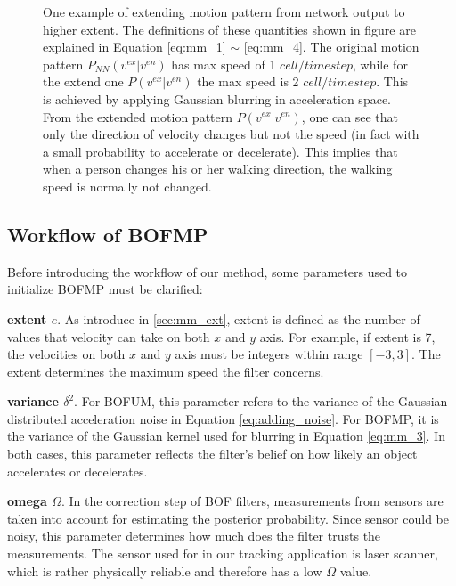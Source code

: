\begin{figure}[hp]
\begin{tabular}{cc}
\end{tabular} 
\caption[One example of extending motion pattern probabilities from network output to higher extent.]{One example of extending motion pattern from network output to higher extent. The definitions of these quantities shown in figure are explained in Equation \ref{eq:mm_1} $\sim$ \ref{eq:mm_4}. The original motion pattern $P_{NN}(v^{ex}|v^{en})$ has max speed of 1 $cell/timestep$, while for the extend one $P(v^{ex}|v^{en})$ the max speed is 2 $cell/timestep$. This is achieved by applying Gaussian blurring in acceleration space. From the extended motion pattern $P(v^{ex}|v^{en})$, one can see that only the direction of velocity changes but not the speed (in fact with a small probability to accelerate or decelerate). This implies that when a person changes his or her walking direction, the walking speed is normally not changed.} 
\label{fig:mm_ext}
\end{figure}

\subsection{Workflow of BOFMP}

Before introducing the workflow of our method, some parameters used to initialize BOFMP must be clarified:

\begin{my_enumerate}
\item \textbf{extent \( e\)}. As introduce in \ref{sec:mm_ext}, extent is defined as the number of values that velocity can take on both $x$ and $y$ axis.	For example, if extent is 7, the velocities on both $x$ and $y$ axis must be integers within range  \( [-3, 3] \). The extent determines the maximum speed the filter concerns. 
\item \textbf{variance \( \delta^2\)}. For BOFUM, this parameter refers to the variance of the Gaussian distributed acceleration noise in Equation \ref{eq:adding_noise}. For BOFMP, it is the variance of the Gaussian kernel used for blurring in Equation \ref{eq:mm_3}. In both cases, this parameter reflects the filter's belief on how likely an object accelerates or decelerates.
\item \textbf{omega \( \Omega \)}. In the correction step of BOF filters, measurements from sensors are taken into account for estimating the posterior probability. Since sensor could be noisy, this parameter determines how much does the filter trusts the measurements. The sensor used for in our tracking application is laser scanner, which is rather physically reliable and therefore has a low \( \Omega \) value.
\end{my_enumerate}


